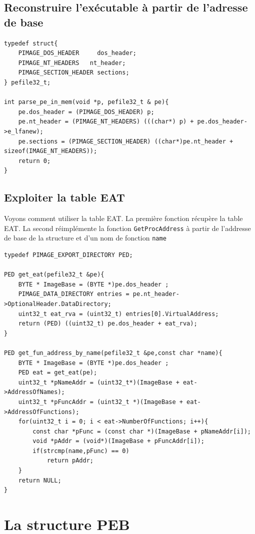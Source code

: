 \documentclass{book}
\newcommand{\code}[1]{\texttt{#1}}
\begin{document}
\subsection{Reconstruire l'exécutable à partir de l'adresse de base}

\begin{verbatim}
typedef struct{
	PIMAGE_DOS_HEADER     dos_header;
	PIMAGE_NT_HEADERS   nt_header;
	PIMAGE_SECTION_HEADER sections;
} pefile32_t;

int parse_pe_in_mem(void *p, pefile32_t & pe){
	pe.dos_header = (PIMAGE_DOS_HEADER) p;
	pe.nt_header = (PIMAGE_NT_HEADERS) (((char*) p) + pe.dos_header->e_lfanew);
	pe.sections = (PIMAGE_SECTION_HEADER) ((char*)pe.nt_header + sizeof(IMAGE_NT_HEADERS));
	return 0;
}
\end{verbatim}


\subsection{Exploiter la table EAT}

Voyons comment utiliser la table EAT. La première fonction récupère la table EAT. La second réimplémente la fonction \code{GetProcAddress} à partir de l'addresse de base de la structure et d'un nom de fonction \code{name}

\begin{verbatim}
typedef PIMAGE_EXPORT_DIRECTORY PED;

PED get_eat(pefile32_t &pe){
	BYTE * ImageBase = (BYTE *)pe.dos_header ;
	PIMAGE_DATA_DIRECTORY entries = pe.nt_header->OptionalHeader.DataDirectory;
	uint32_t eat_rva = (uint32_t) entries[0].VirtualAddress;
	return (PED) ((uint32_t) pe.dos_header + eat_rva);
}

PED get_fun_address_by_name(pefile32_t &pe,const char *name){
	BYTE * ImageBase = (BYTE *)pe.dos_header ;
	PED eat = get_eat(pe);
	uint32_t *pNameAddr = (uint32_t*)(ImageBase + eat->AddressOfNames);
	uint32_t *pFuncAddr = (uint32_t *)(ImageBase + eat->AddressOfFunctions);
	for(uint32_t i = 0; i < eat->NumberOfFunctions; i++){
		const char *pFunc = (const char *)(ImageBase + pNameAddr[i]);
		void *pAddr = (void*)(ImageBase + pFuncAddr[i]);
		if(strcmp(name,pFunc) == 0)
			return pAddr;
	}
	return NULL;
}
\end{verbatim}


\section{La structure PEB}
\end{document}
